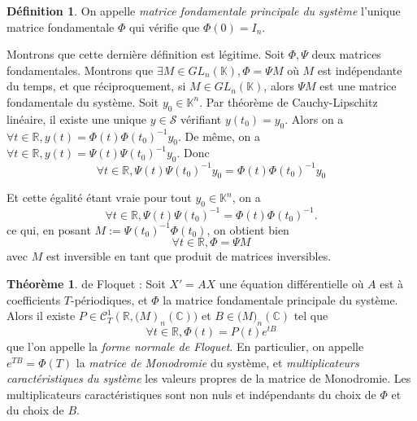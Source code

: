 \documentclass[12pt]{article}
\theoremstyle{definition}
\newtheorem*{definition}{Définition}
\theoremstyle{definition}
\newtheorem*{theorem}{Théorème}
\begin{document}
	\begin{definition}
		On appelle \emph{matrice fondamentale principale du système} l'unique matrice fondamentale $\Phi$ qui vérifie que $\Phi(0)=I_n$.
	\end{definition}
	
	Montrons que cette dernière définition est légitime. Soit $\Phi, \Psi$ deux matrices fondamentales. Montrons que $\exists M \in GL_n(\mathbb{K}), \Phi = \Psi M$ où $M$ est indépendante du temps, et que réciproquement, si $M \in GL_n(\mathbb{K})$, alors $\Psi M$ est une matrice fondamentale du système. Soit $y_0 \in \mathbb{K}^n$. Par théorème de Cauchy-Lipschitz linéaire, il existe une unique $y \in \mathcal{S}$ vérifiant $y(t_0) = y_0$. Alors on a $\forall t \in \mathbb{R}, y(t) = \Phi(t)\Phi(t_0)^{-1}y_0$. De même, on a $\forall t \in \mathbb{R}, y(t) = \Psi(t)\Psi(t_0)^{-1}y_0$. Donc 
	\begin{equation}
		\forall t \in \mathbb{R}, \Psi(t)\Psi(t_0)^{-1}y_0 = \Phi(t)\Phi(t_0)^{-1}y_0
	\end{equation}
	
	Et cette égalité étant vraie pour tout $y_0 \in \mathbb{K}^n$, on a 
	\begin{equation}
		\forall t \in \mathbb{R}, \Psi(t)\Psi(t_0)^{-1} = \Phi(t)\Phi(t_0)^{-1}.
	\end{equation}
	ce qui, en posant $M := \Psi(t_0)^{-1}\Phi(t_0)$, on obtient bien
	\begin{equation}
		\forall t \in \mathbb{R}, \Phi = \Psi M
	\end{equation}
	avec $M$ est inversible en tant que produit de matrices inversibles.
	\\
	
	\begin{theorem}
		de Floquet : Soit $X'=AX$ une équation différentielle où $A$ est à coefficients $T$-périodiques, et $\Phi$ la matrice fondamentale principale du système. Alors il existe $P \in \mathcal{C}^1_T(\mathbb{R}, \mathcal(M)_n(\mathbb{C}))$ et $B \in \mathcal(M)_n(\mathbb{C})$ tel que
		\begin{equation*}
			\forall t \in \mathbb{R}, \Phi(t) = P(t)e^{tB}
		\end{equation*}
		que l'on appelle la \textit{forme normale de Floquet}. En particulier, on appelle $e^{TB}=\Phi(T)$ la \textit{matrice de Monodromie} du système, et \textit{multiplicateurs caractéristiques du système} les valeurs propres de la matrice de Monodromie. Les multiplicateurs caractéristiques sont non nuls et indépendants du choix de $\Phi$ et du choix de $B$.
	\end{theorem}
	
\end{document}
